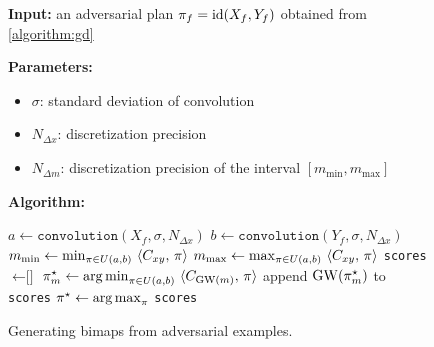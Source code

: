                 \begin{figure}[h]
                    \centering
                    \begin{minipage}{.8\linewidth}
                        \begin{algorithm}[H]
                            \caption{Generating bimaps from adversarial examples.}
                            \label{algorithm:bimap}
                        \vspace{1mm}
                        \textbf{Input:} an adversarial plan $\pi_f=\operatorname{id}(X_f,Y_f)$ obtained from \cref{algorithm:gd}

                        \vspace{3mm}
                        \noindent\textbf{Parameters:}
                        \begin{itemize}[nolistsep]
                            \item $\sigma$: standard deviation of convolution
                            \item $N_{\Delta x}$: discretization precision
                            \item $N_{\Delta m}$: discretization precision of the interval $[m_\text{min},m_\text{max}]$
                        \end{itemize}
                        \vspace{3mm}
                        \textbf{Algorithm:}
                        \begin{algorithmic}[1]
                            \State $a\gets \texttt{convolution}(X_f,\sigma,N_{\Delta x})$
                            \State $b\gets \texttt{convolution}(Y_f,\sigma,N_{\Delta x})$ 
                            \State $m_{\vphantom{\text{max}}\text{min}}\gets \min_{\pi\in U(a,b)}\ \langle C_{xy},\,\pi\rangle$ 
                            \State $m_{\vphantom{\text{min}}\text{max}}\gets \max_{\pi\in U(a,b)}\ \langle C_{xy},\,\pi\rangle$
                            \State \texttt{scores} $\gets \texttt{[]}$
                             
                                \State $\pi\opt_{m}\gets \argmin_{\pi\in U(a,b)}\ \langle C_{\GW(m)},\,\pi\rangle$ 
                                \State append $\operatorname{GW}(\pi^\star_{m})$ to \texttt{scores}
                            \EndFor
                            \State $\pi^\star\gets\operatorname*{arg\,max}_\pi$ \texttt{scores} 

\end{algorithmic}
\end{algorithm}
\end{minipage}
\end{figure}
